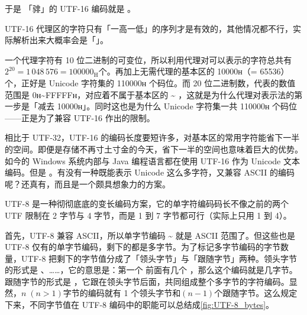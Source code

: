 于是 \phantom{（}\hspace{-.5em}「𬴂」的 UTF-16 编码就是 。

\begin{note}
  UTF-16 代理区的字符只有「一高一低」的序列才是有效的，其他情况都不行，实际解析出来大概率会是「\replacesymb」。
\end{note}

一个代理字符有 10 位二进制的可变位，所以利用代理对可以表示的字符总共有$2^{20} = 1\,048\,576 = 100000_{\mathrm{H}}$个。再加上无需代理的基本区的 10000ʜ（= 65536）个，正好是 Unicode 字符集的 110000ʜ 个码位。而 20 位二进制数，代表的数值范围是 0ʜ\textasciitilde{}FFFFFʜ，对应着不属于基本区的 \textasciitilde{} ，这就是为什么代理对表示法的第一步是「减去 10000ʜ」。同时这也是为什么 Unicode 字符集一共 110000ʜ 个码位——正是为了兼容 UTF-16 作出的限制。

相比于 UTF-32，UTF-16 的编码长度要短许多，对基本区的常用字符能省下一半的空间。即便是存储不再寸土寸金的今天，省下一半的空间也意味着巨大的优势。如今的 Windows 系统内部与 Java 编程语言都在使用 UTF-16 作为 Unicode 文本编码。但是 。有没有一种既能表示 Unicode 这么多字符，又兼容 ASCII 的编码呢？还真有，而且是一个颇具想象力的方案。

UTF-8 是一种彻彻底底的变长编码方案，它的单字符编码码长不像之前的两个 UTF 限制在 2 字节与 4 字节，而是 1 到 7 字节都可行（实际上只用 1 到 4）。

首先，UTF-8 兼容 ASCII，所以单字节编码 \textasciitilde{} 就是 ASCII 范围了。但这些也是 UTF-8 仅有的单字节编码，剩下的都是多字节。为了标记多字节编码的字节数量，UTF-8 把剩下的字节值分成了「领头字节」与「跟随字节」两种。领头字节的形式是 、……，它的意思是：第一个  前面有几个 ，那么这个编码就是几字节。跟随字节的形式是 ，它跟在领头字节后面，共同组成整个多字节的字符编码。显然，$n\;(n>1)$字节的编码就有 1 个领头字节和$(n-1)$个跟随字节。这么规定下来，不同字节值在 UTF-8 编码中的职能可以总结成\autoref{fig:UTF-8_bytes}。

